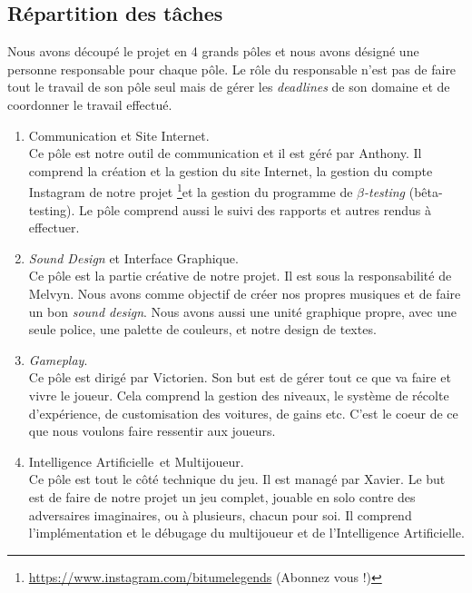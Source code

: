 \documentclass[11pt,a4paper]{article}
\newcommand{\AI}{Intelligence Artificielle}
\begin{document}
  \subsection{Répartition des tâches} 
    Nous avons découpé le projet en 4 grands pôles et nous avons désigné une personne responsable
    pour chaque pôle. Le rôle du responsable n'est pas de faire tout le travail de son pôle seul mais
    de gérer les \textit{deadlines} de son domaine et de coordonner le travail effectué.\\
    \begin{enumerate}
      \item Communication et Site Internet.\\
        Ce pôle est notre outil de communication et il est géré par Anthony. Il comprend la création
        et la gestion du site Internet, la gestion du compte Instagram de notre projet \footnote{\url{https://www.instagram.com/bitumelegends} (Abonnez vous !)}et la
        gestion du programme de \(\beta\)\textit{-testing} (bêta-testing). Le pôle comprend aussi le suivi
        des rapports et autres rendus à effectuer.
        \\
      \item \textit{Sound Design} et Interface Graphique.\\
        Ce pôle est la partie créative de notre projet. Il est sous la responsabilité de Melvyn.
        Nous avons comme objectif de créer nos propres musiques et de faire un bon \textit{sound design}.
        Nous avons aussi une unité graphique propre, avec une seule police, une palette de couleurs, et notre
        design de textes.
\\
      \item \textit{Gameplay}.\\
        Ce pôle est dirigé par Victorien.
        Son but est de gérer tout ce que va faire et vivre le joueur. Cela comprend la gestion des niveaux,
        le système de récolte d'expérience, de customisation des voitures, de gains etc. C'est le coeur 
        de ce que nous voulons faire ressentir aux joueurs.
        \\
      \item \AI\, et Multijoueur.\\
        Ce pôle est tout le côté technique du jeu. Il est managé par Xavier. Le but est de faire de notre projet
        un jeu complet, jouable en solo contre des adversaires imaginaires, ou à plusieurs, chacun pour soi. Il 
        comprend l'implémentation et le débugage du multijoueur et de l'\AI.
    \end{enumerate}
  \clearpage
\end{document}
